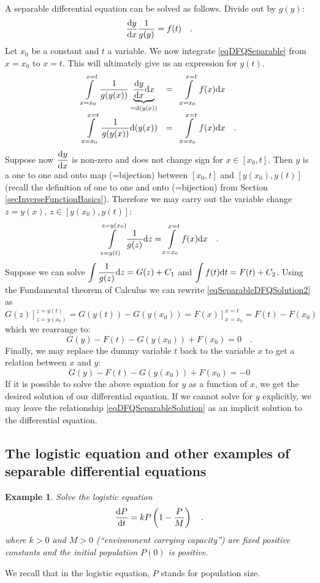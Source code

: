 \documentclass[12pt]{book}
\newtheorem{example}[theorem]{Example}
\begin{document}
A separable differential equation can be solved as follows. Divide out by $g(y)$:
\[
\frac{{\normalfont \text{d}} y}{{\normalfont \text{d}} x} \frac{1}{g(y)}= f(t)\quad .
\]
Let $x_0$ be a constant and $t$ a variable. We now integrate \eqref{eqDFQSeparable} from $x=x_0$ to $x=t$. This will ultimately give us an expression for $y(t)$.
\begin{equation}\label{eqSeparableDFQSolution1}
\begin{array}{rcl}
\displaystyle \int\limits_{x=x_0}^{x=t}\frac{1}{g(y(x))} \underbrace{\frac{{\normalfont \text{d}} y}{{\normalfont \text{d}} x}{\normalfont \text{d}} x}_{= {\normalfont \text{d}} (y(x))}&=&\displaystyle \int \limits_{ x=x_0}^{ x=t}  f(x){\normalfont \text{d}} x
\\
\displaystyle \int\limits_{x= x_0}^{x=t}\frac{ 1}{g( y(x))} {\normalfont \text{d}} (y(x))&=&\displaystyle \int \limits_{ x=x_0}^{x=t}  f(x){\normalfont \text{d}} x
\quad .
\end{array}
\end{equation}
Suppose now $\displaystyle \frac{{\normalfont \text{d}} y }{{\normalfont \text{d}} x}$ is non-zero and does not change sign for $x\in [x_0, t]$.  Then $y$ is a one to one and onto map (=bijection) between $[x_0, t]$ and $[y(x_0), y(t)]$ (recall the definition of one to one and onto (=bijection) from Section \ref {secInverseFunctionBasics}). Therefore we may carry out the variable change $z=y(x)$, $z\in [y(x_0), y(t)]$:
\begin{equation}\label{eqSeparableDFQSolution2}
\displaystyle \int \limits_{ z=y(t)}^{z=y(x_0)}\frac{1}{g(z)} {\normalfont \text{d}} z=\displaystyle \int\limits_{x=x_0}^{x=t}  f(x){\normalfont \text{d}} x\quad .
\end{equation}
Suppose we can solve $\displaystyle \int \frac{1}{g(z)}{\normalfont \text{d}} z = G(z)+C_1$ and $\displaystyle \int  f(t){\normalfont \text{d}} t=F(t)+C_2$. Using the Fundamental theorem of Calculus we can rewrite \eqref{eqSeparableDFQSolution2} as
\[
\left.G(z)\right]_{z=y(x_0)}^{z=y(t)}=
G(y(t))-G(y(x_0)) = \left. F(x) \right]_{x=x_0}^{x=t}= F(t)-F(x_0)
\]
which we rearrange to:
\[
G(y)-F(t)-G(y(x_0))+ F(x_0)=0\quad .
\]
Finally, we may replace the dummy variable $t$ back to the variable $x$ to get a relation between $ x$ and $y$:
\begin{equation}\label{eqDFQSeparableSolution}
G(y)-F(t)-G(y(x_0))+ F(x_0)=-0
\end{equation}
If it is possible to solve the above equation for $y$ as a function of $x$, we get the desired solution of our differential equation. If we cannot solve for $y$ explicitly, we may leave the relationship  \eqref{eqDFQSeparableSolution} as an implicit solution to the differential equation.
\subsection{The logistic equation and other examples of separable differential equations}
\begin{example} Solve the logistic equation
\[
\frac{{\normalfont \text{d}} P}{{\normalfont \text{d}} t}= k P\left(1-\frac{P}{M}\right)\quad.
\]
where $k>0$ and $M>0$ (``environment carrying capacity'') are fixed positive constants and the initial population $P(0)$ is positive.
\end{example}
We recall that in the logistic equation, $P$ stands for population size.
\end{document}
